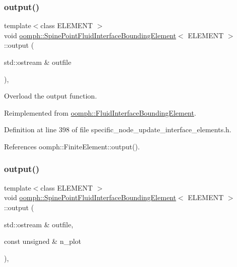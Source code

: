 \subsubsection{\texorpdfstring{output()}{output()}\hspace{0.1cm}{\footnotesize\ttfamily [1/4]}}
{\footnotesize\ttfamily template$<$class E\+L\+E\+M\+E\+NT $>$ \\
void \hyperlink{classoomph_1_1SpinePointFluidInterfaceBoundingElement}{oomph\+::\+Spine\+Point\+Fluid\+Interface\+Bounding\+Element}$<$ E\+L\+E\+M\+E\+NT $>$\+::output (\begin{DoxyParamCaption}\item[{std\+::ostream \&}]{outfile }\end{DoxyParamCaption})\hspace{0.3cm}{\ttfamily [inline]}, {\ttfamily [virtual]}}



Overload the output function. 



Reimplemented from \hyperlink{classoomph_1_1FluidInterfaceBoundingElement_a81adc5ae89ddfa120f587c61b972622f}{oomph\+::\+Fluid\+Interface\+Bounding\+Element}.



Definition at line 398 of file specific\+\_\+node\+\_\+update\+\_\+interface\+\_\+elements.\+h.



References oomph\+::\+Finite\+Element\+::output().

\mbox{\label{classoomph_1_1SpinePointFluidInterfaceBoundingElement_a05a5383f07c840e07d8c2279cce80aaa}} 
\subsubsection{\texorpdfstring{output()}{output()}\hspace{0.1cm}{\footnotesize\ttfamily [2/4]}}
{\footnotesize\ttfamily template$<$class E\+L\+E\+M\+E\+NT $>$ \\
void \hyperlink{classoomph_1_1SpinePointFluidInterfaceBoundingElement}{oomph\+::\+Spine\+Point\+Fluid\+Interface\+Bounding\+Element}$<$ E\+L\+E\+M\+E\+NT $>$\+::output (\begin{DoxyParamCaption}\item[{std\+::ostream \&}]{outfile,  }\item[{const unsigned \&}]{n\+\_\+plot }\end{DoxyParamCaption})\hspace{0.3cm}{\ttfamily [inline]}, {\ttfamily [virtual]}}



